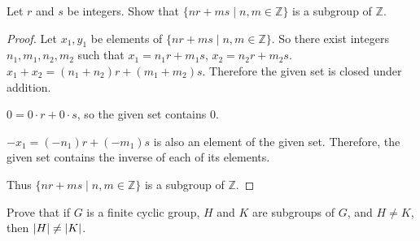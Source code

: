 \newpage
\begin{exercise}
    Let $r$ and $s$ be integers. Show that $\{ nr + ms \mid n, m \in \mathbb{Z} \}$ is a subgroup of $\mathbb{Z}$.
\end{exercise}

\begin{proof}
    Let $x_{1}, y_{1}$ be elements of $\{ nr + ms \mid n, m \in \mathbb{Z} \}$. So there exist integers $n_{1}, m_{1}, n_{2}, m_{2}$ such that $x_{1} = n_{1}r + m_{1}s$, $x_{2} = n_{2}r + m_{2}s$. $x_{1} + x_{2} = (n_{1} + n_{2})r + (m_{1} + m_{2})s$. Therefore the given set is closed under addition.

    $0 = 0\cdot r + 0\cdot s$, so the given set contains $0$.

    $-x_{1} = (-n_{1})r + (-m_{1})s$ is also an element of the given set. Therefore, the given set contains the inverse of each of its elements.

    Thus $\{ nr + ms \mid n, m \in \mathbb{Z} \}$ is a subgroup of $\mathbb{Z}$.
\end{proof}

\newpage
\begin{exercise}
    Prove that if $G$ is a finite cyclic group, $H$ and $K$ are subgroups of $G$, and $H\ne K$, then $\left\vert{H}\right\vert \ne \left\vert{K}\right\vert$.
\end{exercise}

